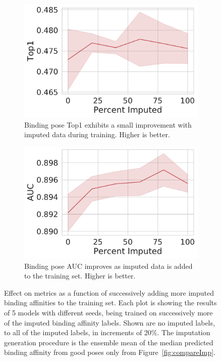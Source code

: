 \documentclass[journal=jmcmar,manuscript=article]{achemso}
\begin{document}
\begin{figure}[tbph]
    \begin{subfigure}[t]{0.48\textwidth}
        \centering
        \includegraphics[width=\linewidth]{figures/MedGOEns_addingImpTop1.pdf}
        \caption{Binding pose Top1 exhibits a small improvement with imputed data during training. Higher is better.}
    \end{subfigure}
    \hfill
    \begin{subfigure}[t]{0.48\textwidth}
        \centering
        \includegraphics[width=\linewidth]{figures/MedGOEns_addingImpAUC.pdf}
        \caption{Binding pose AUC improves as imputed data is added to the training set. Higher is better.}
    \end{subfigure}
    \caption{Effect on metrics as a function of successively adding more imputed binding affinities to the training set. Each plot is showing the results of 5 models with different seeds, being trained on successively more of the imputed binding affinity labels. Shown are no imputed labels, to all of the imputed labels, in increments of 20\%. The imputation generation procedure is the ensemble mean of the median predicted binding affinity from good poses only from Figure~\ref{fig:compareImp}.}
    \label{fig:medGOEnsAdding}
\end{figure}
\end{document}
